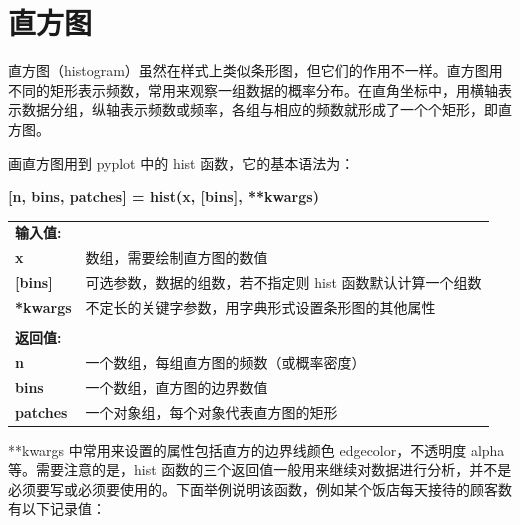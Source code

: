 \clearpage
\section{直方图}

直方图（histogram）虽然在样式上类似条形图，但它们的作用不一样。直方图用不同的矩形表示频数，常用来观察一组数据的概率分布。在直角坐标中，用横轴表示数据分组，纵轴表示频数或频率，各组与相应的频数就形成了一个个矩形，即直方图。

画直方图用到 pyplot 中的 hist 函数，它的基本语法为：

\begin{center}
\begin{tcolorbox}[title = hist 函数的语法]
\textbf{[n, bins, patches] = hist(x, [bins], **kwargs)}
\tcblower
\vspace{5pt}

\begin{tcboutputlisting}
\begin{tabular}{>{\bfseries}ll}
  \textbf{输入值:}&\\
    x &数组，需要绘制直方图的数值\\

  [bins] &可选参数，数据的组数，若不指定则 hist 函数默认计算一个组数\\

**kwargs &不定长的关键字参数，用字典形式设置条形图的其他属性\\
&\\
  \textbf{返回值:} &\\
n &一个数组，每组直方图的频数（或概率密度）\\
bins &一个数组，直方图的边界数值\\
patches & 一个对象组，每个对象代表直方图的矩形

\end{tabular}

\tcblower

\end{tcboutputlisting}
\tcbuselistingtext
\end{tcolorbox}
\end{center}

**kwargs 中常用来设置的属性包括直方的边界线颜色 edgecolor，不透明度 alpha 等。需要注意的是，hist 函数的三个返回值一般用来继续对数据进行分析，并不是必须要写或必须要使用的。下面举例说明该函数，例如某个饭店每天接待的顾客数有以下记录值：

